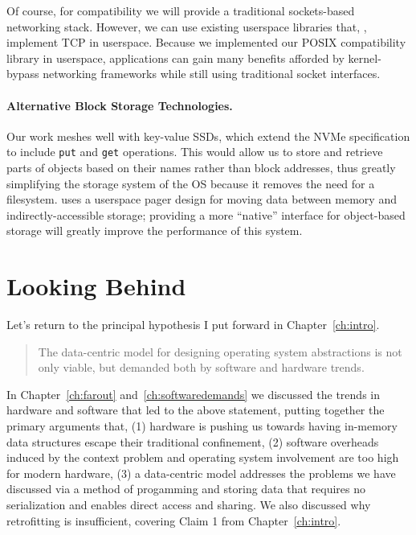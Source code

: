     Of course, for compatibility we will provide a traditional sockets-based networking stack. However,
    we can use existing userspace libraries that, \eg, implement TCP in userspace.
    Because we implemented our POSIX compatibility library in userspace, applications can gain many
    benefits afforded by kernel-bypass networking frameworks while still using traditional socket
    interfaces.

\fi

\paragraph{Alternative Block Storage Technologies.}

Our work meshes well with key-value SSDs, which extend the NVMe
specification to include \texttt{put} and \texttt{get} operations. This would allow us to store and
retrieve parts of objects based on their names rather than block addresses, thus greatly
simplifying the storage system of the OS because it removes the need for a filesystem. \Twizzler
uses a userspace pager design for moving data between memory and indirectly-accessible storage;
providing a more ``native'' interface for object-based storage will greatly improve the performance
of this system.



\section{Looking Behind}


Let's return to the principal hypothesis I put forward in Chapter~\ref{ch:intro}.

\begin{quotation}
    \noindent The data-centric model
    for designing operating system abstractions is not only viable, but demanded both by software and hardware trends.
\end{quotation}

In Chapter~\ref{ch:farout} and~\ref{ch:softwaredemands} we discussed the trends in hardware and software that led to
the above statement, putting together the primary arguments that, (1) hardware is pushing us towards having in-memory
data structures escape their traditional confinement, (2) software overheads induced by the context problem and
operating system involvement are too high for modern hardware, (3) a data-centric model addresses the problems we have
discussed via a method of progamming and storing data that requires no serialization and enables direct access and
sharing. We also discussed why retrofitting is insufficient, covering Claim 1 from Chapter~\ref{ch:intro}.

